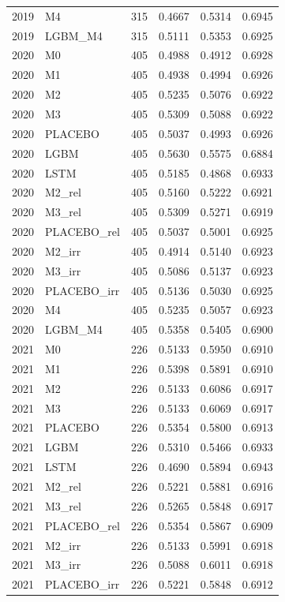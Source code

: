 \begin{tabular}{llrrrr}
2019 & M4 & 315 & 0.4667 & 0.5314 & 0.6945 \\
2019 & LGBM\_M4 & 315 & 0.5111 & 0.5353 & 0.6925 \\
2020 & M0 & 405 & 0.4988 & 0.4912 & 0.6928 \\
2020 & M1 & 405 & 0.4938 & 0.4994 & 0.6926 \\
2020 & M2 & 405 & 0.5235 & 0.5076 & 0.6922 \\
2020 & M3 & 405 & 0.5309 & 0.5088 & 0.6922 \\
2020 & PLACEBO & 405 & 0.5037 & 0.4993 & 0.6926 \\
2020 & LGBM & 405 & 0.5630 & 0.5575 & 0.6884 \\
2020 & LSTM & 405 & 0.5185 & 0.4868 & 0.6933 \\
2020 & M2\_rel & 405 & 0.5160 & 0.5222 & 0.6921 \\
2020 & M3\_rel & 405 & 0.5309 & 0.5271 & 0.6919 \\
2020 & PLACEBO\_rel & 405 & 0.5037 & 0.5001 & 0.6925 \\
2020 & M2\_irr & 405 & 0.4914 & 0.5140 & 0.6923 \\
2020 & M3\_irr & 405 & 0.5086 & 0.5137 & 0.6923 \\
2020 & PLACEBO\_irr & 405 & 0.5136 & 0.5030 & 0.6925 \\
2020 & M4 & 405 & 0.5235 & 0.5057 & 0.6923 \\
2020 & LGBM\_M4 & 405 & 0.5358 & 0.5405 & 0.6900 \\
2021 & M0 & 226 & 0.5133 & 0.5950 & 0.6910 \\
2021 & M1 & 226 & 0.5398 & 0.5891 & 0.6910 \\
2021 & M2 & 226 & 0.5133 & 0.6086 & 0.6917 \\
2021 & M3 & 226 & 0.5133 & 0.6069 & 0.6917 \\
2021 & PLACEBO & 226 & 0.5354 & 0.5800 & 0.6913 \\
2021 & LGBM & 226 & 0.5310 & 0.5466 & 0.6933 \\
2021 & LSTM & 226 & 0.4690 & 0.5894 & 0.6943 \\
2021 & M2\_rel & 226 & 0.5221 & 0.5881 & 0.6916 \\
2021 & M3\_rel & 226 & 0.5265 & 0.5848 & 0.6917 \\
2021 & PLACEBO\_rel & 226 & 0.5354 & 0.5867 & 0.6909 \\
2021 & M2\_irr & 226 & 0.5133 & 0.5991 & 0.6918 \\
2021 & M3\_irr & 226 & 0.5088 & 0.6011 & 0.6918 \\
2021 & PLACEBO\_irr & 226 & 0.5221 & 0.5848 & 0.6912 \\

\end{tabular}
